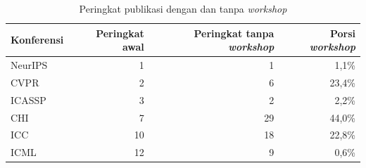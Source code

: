 \begin{table}[!htb]
\caption{Peringkat publikasi dengan dan tanpa \textit{workshop}}
\label{tab:sensitivitas}
\small
\begin{tabular*}{\textwidth}{@{\extracolsep{\fill}}@{}lrrr@{}}
\toprule
\textbf{Konferensi} & \textbf{Peringkat awal} & \textbf{Peringkat tanpa \textit{workshop}} & \textbf{Porsi \textit{workshop}} \\
\midrule
NeurIPS & 1 & 1 & 1,1\% \\
CVPR & 2 & 6 & 23,4\% \\
ICASSP & 3 & 2 & 2,2\% \\
CHI & 7 & 29 & 44,0\% \\
ICC & 10 & 18 & 22,8\% \\
ICML & 12 & 9 & 0,6\% \\
\bottomrule
\end{tabular*}
\end{table}
